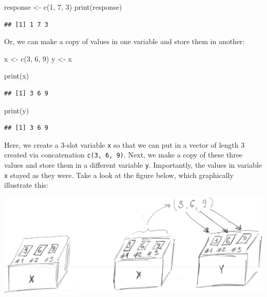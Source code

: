 \documentclass[
]{book}
\newenvironment{Shaded}{\begin{snugshade}}{\end{snugshade}}
\newcommand{\DecValTok}[1]{\textcolor[rgb]{0.00,0.00,0.81}{#1}}
\newcommand{\FunctionTok}[1]{\textcolor[rgb]{0.00,0.00,0.00}{#1}}
\newcommand{\NormalTok}[1]{#1}
\newcommand{\OtherTok}[1]{\textcolor[rgb]{0.56,0.35,0.01}{#1}}
\begin{document}
\begin{Shaded}
\begin{Highlighting}[]
\NormalTok{response }\OtherTok{\textless{}{-}} \FunctionTok{c}\NormalTok{(}\DecValTok{1}\NormalTok{, }\DecValTok{7}\NormalTok{, }\DecValTok{3}\NormalTok{)}
\FunctionTok{print}\NormalTok{(response)}
\end{Highlighting}
\end{Shaded}

\begin{verbatim}
## [1] 1 7 3
\end{verbatim}

Or, we can make a copy of values in one variable and store them in another:

\begin{Shaded}
\begin{Highlighting}[]
\NormalTok{x }\OtherTok{\textless{}{-}} \FunctionTok{c}\NormalTok{(}\DecValTok{3}\NormalTok{, }\DecValTok{6}\NormalTok{, }\DecValTok{9}\NormalTok{)}
\NormalTok{y }\OtherTok{\textless{}{-}}\NormalTok{ x }

\FunctionTok{print}\NormalTok{(x)}
\end{Highlighting}
\end{Shaded}

\begin{verbatim}
## [1] 3 6 9
\end{verbatim}

\begin{Shaded}
\begin{Highlighting}[]
\FunctionTok{print}\NormalTok{(y)}
\end{Highlighting}
\end{Shaded}

\begin{verbatim}
## [1] 3 6 9
\end{verbatim}

Here, we create a 3-slot variable \texttt{x} so that we can put in a vector of length 3 created via concatenation \texttt{c(3,\ 6,\ 9)}. Next, we make a copy of these three values and store them in a different variable \texttt{y}. Importantly, the values in variable \texttt{x} stayed as they were. Take a look at the figure below, which graphically illustrate this:

\begin{center}\includegraphics[width=1\linewidth]{images/copy-vector} \end{center}
\end{document}

